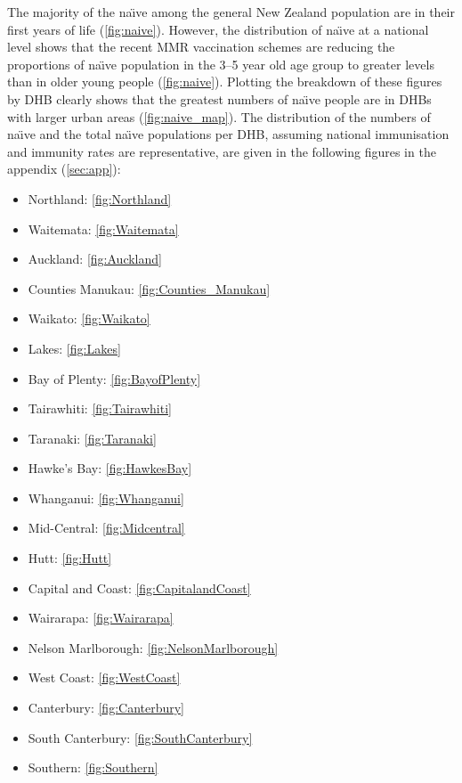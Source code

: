 \documentclass{article}
\begin{document}
The majority of the na\"{\i}ve among the general New Zealand population are in their first years of life (\autoref{fig:naive}). However, the distribution of na\"{\i}ve at a national level shows that the recent MMR vaccination schemes are reducing the proportions of na\"{\i}ve population in the 3--5 year old age group to greater levels than in older young people  (\autoref{fig:naive}). Plotting the breakdown of these figures by DHB clearly shows that the greatest numbers of na\"{\i}ve people are in DHBs with larger urban areas (\autoref{fig:naive_map}). The distribution of the numbers of na\"{\i}ve and the total na\"{\i}ve populations per DHB, assuming national immunisation and immunity rates are representative, are given in the following figures in the appendix (\autoref{sec:app}): 
\begin{itemize}[noitemsep,nolistsep]
\item Northland: \autoref{fig:Northland}
\item Waitemata: \autoref{fig:Waitemata}
\item Auckland: \autoref{fig:Auckland}
\item Counties Manukau: \autoref{fig:Counties_Manukau}
\item Waikato: \autoref{fig:Waikato}
\item Lakes: \autoref{fig:Lakes}
\item Bay of Plenty: \autoref{fig:BayofPlenty}
\item Tairawhiti: \autoref{fig:Tairawhiti}
\item Taranaki: \autoref{fig:Taranaki}
\item Hawke's Bay: \autoref{fig:HawkesBay}
\item Whanganui: \autoref{fig:Whanganui}
\item Mid-Central: \autoref{fig:Midcentral}
\item Hutt: \autoref{fig:Hutt}
\item Capital and Coast: \autoref{fig:CapitalandCoast}
\item Wairarapa: \autoref{fig:Wairarapa}
\item Nelson Marlborough: \autoref{fig:NelsonMarlborough}
\item West Coast: \autoref{fig:WestCoast}
\item Canterbury: \autoref{fig:Canterbury}
\item South Canterbury: \autoref{fig:SouthCanterbury}
\item Southern: \autoref{fig:Southern}
\end{itemize}
\end{document}

